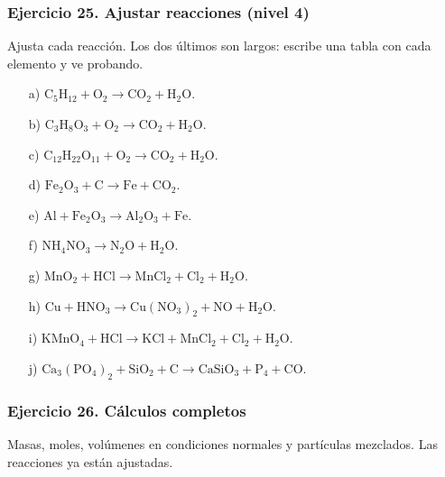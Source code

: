\subsubsection*{Ejercicio 25. Ajustar reacciones (nivel 4)}

Ajusta cada reacción.
Los dos últimos son largos: escribe una tabla con cada elemento y ve probando.

\begin{enumerate}
    \item[a)] $\mathrm{C_5H_{12}}+\mathrm{O_2}\rightarrow
    \mathrm{CO_2}+\mathrm{H_2O}$.
    \item[b)] $\mathrm{C_3H_8O_3}+\mathrm{O_2}\rightarrow
    \mathrm{CO_2}+\mathrm{H_2O}$.
    \item[c)] $\mathrm{C_{12}H_{22}O_{11}}+\mathrm{O_2}\rightarrow
    \mathrm{CO_2}+\mathrm{H_2O}$.
    \item[d)] $\mathrm{Fe_2O_3}+\mathrm{C}\rightarrow\mathrm{Fe}+\mathrm{CO_2}$.
    \item[e)] $\mathrm{Al}+\mathrm{Fe_2O_3}\rightarrow
    \mathrm{Al_2O_3}+\mathrm{Fe}$.
    \item[f)] $\mathrm{NH_4NO_3}\rightarrow\mathrm{N_2O}+\mathrm{H_2O}$.
    \item[g)] $\mathrm{MnO_2}+\mathrm{HCl}\rightarrow
    \mathrm{MnCl_2}+\mathrm{Cl_2}+\mathrm{H_2O}$.
    \item[h)] $\mathrm{Cu}+\mathrm{HNO_3}\rightarrow
    \mathrm{Cu(NO_3)_2}+\mathrm{NO}+\mathrm{H_2O}$.
    \item[i)] $\mathrm{KMnO_4}+\mathrm{HCl}\rightarrow
    \mathrm{KCl}+\mathrm{MnCl_2}+\mathrm{Cl_2}+\mathrm{H_2O}$.
    \item[j)] $\mathrm{Ca_3(PO_4)_2}+\mathrm{SiO_2}+\mathrm{C}\rightarrow
    \mathrm{CaSiO_3}+\mathrm{P_4}+\mathrm{CO}$.
\end{enumerate}

\subsubsection*{Ejercicio 26. Cálculos completos}

Masas, moles, volúmenes en condiciones normales y partículas mezclados.
Las reacciones ya están ajustadas.


